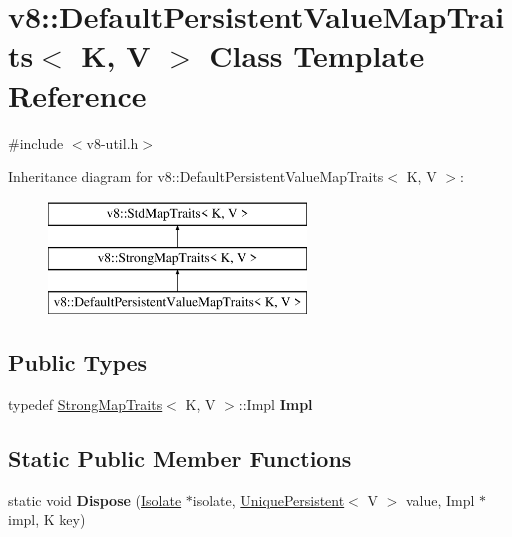 \hypertarget{classv8_1_1_default_persistent_value_map_traits}{}\section{v8\+:\+:Default\+Persistent\+Value\+Map\+Traits$<$ K, V $>$ Class Template Reference}
\label{classv8_1_1_default_persistent_value_map_traits}


{\ttfamily \#include $<$v8-\/util.\+h$>$}

Inheritance diagram for v8\+:\+:Default\+Persistent\+Value\+Map\+Traits$<$ K, V $>$\+:\begin{figure}[H]
\begin{center}
\leavevmode
\includegraphics[height=3.000000cm]{classv8_1_1_default_persistent_value_map_traits}
\end{center}
\end{figure}
\subsection*{Public Types}
\begin{DoxyCompactItemize}
\item 
\hypertarget{classv8_1_1_default_persistent_value_map_traits_aaeb6c233c3e4a34a1168c04906ddebbf}{}typedef \hyperlink{classv8_1_1_strong_map_traits}{Strong\+Map\+Traits}$<$ K, V $>$\+::Impl {\bfseries Impl}\label{classv8_1_1_default_persistent_value_map_traits_aaeb6c233c3e4a34a1168c04906ddebbf}

\end{DoxyCompactItemize}
\subsection*{Static Public Member Functions}
\begin{DoxyCompactItemize}
\item 
\hypertarget{classv8_1_1_default_persistent_value_map_traits_a305ab1910886dd4d1d7ce67539c42ecb}{}static void {\bfseries Dispose} (\hyperlink{classv8_1_1_isolate}{Isolate} $\ast$isolate, \hyperlink{classv8_1_1_unique_persistent}{Unique\+Persistent}$<$ V $>$ value, Impl $\ast$impl, K key)\label{classv8_1_1_default_persistent_value_map_traits_a305ab1910886dd4d1d7ce67539c42ecb}

\end{DoxyCompactItemize}

